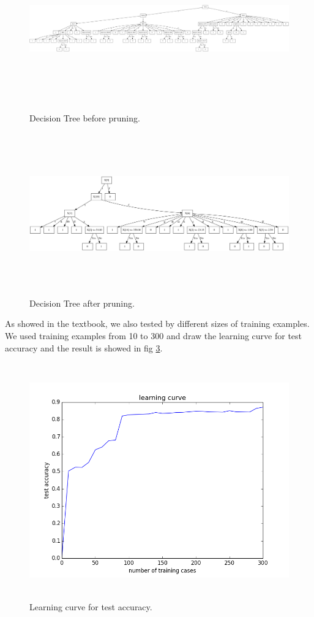 \documentclass[11pt]{article}
\begin{document}
\begin{figure}[h!]
\centering
\includegraphics[height=2.75in, width=6.5in]{before.png}
\caption{Decision Tree before pruning.}
\label{before}
\end{figure}

\begin{figure}[h!]
\centering
\includegraphics[height=2.75in, width=6.5in]{after.png}
\caption{Decision Tree after pruning.}
\label{after}
\end{figure}


As showed in the textbook, we also tested by different sizes of training examples. We used training examples from 10 to 300
and draw the learning curve for test accuracy and the result is showed in fig \ref{learn}.
\begin{figure}[h!]
\centering
\includegraphics[height=4in, width=5in]{learn.png}
\caption{Learning curve for test accuracy.}
\label{learn}
\end{figure}
\end{document}

